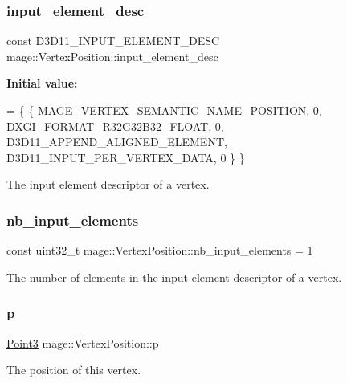 \subsubsection{\texorpdfstring{input\+\_\+element\+\_\+desc}{input\_element\_desc}}
{\footnotesize\ttfamily const D3\+D11\+\_\+\+I\+N\+P\+U\+T\+\_\+\+E\+L\+E\+M\+E\+N\+T\+\_\+\+D\+E\+SC mage\+::\+Vertex\+Position\+::input\+\_\+element\+\_\+desc\hspace{0.3cm}{\ttfamily [static]}}

{\bfseries Initial value\+:}
\begin{DoxyCode}
= \{
        \{ MAGE\_VERTEX\_SEMANTIC\_NAME\_POSITION, 0, DXGI\_FORMAT\_R32G32B32\_FLOAT,    0, 
      D3D11\_APPEND\_ALIGNED\_ELEMENT, D3D11\_INPUT\_PER\_VERTEX\_DATA, 0 \}
    \}
\end{DoxyCode}
The input element descriptor of a vertex. \hypertarget{structmage_1_1_vertex_position_a788286b735c09aa85d855c2773d1a504}{}\label{structmage_1_1_vertex_position_a788286b735c09aa85d855c2773d1a504} 
\subsubsection{\texorpdfstring{nb\+\_\+input\+\_\+elements}{nb\_input\_elements}}
{\footnotesize\ttfamily const uint32\+\_\+t mage\+::\+Vertex\+Position\+::nb\+\_\+input\+\_\+elements = 1\hspace{0.3cm}{\ttfamily [static]}}

The number of elements in the input element descriptor of a vertex. \hypertarget{structmage_1_1_vertex_position_ad9c3ea68e2c1745446387d1eca28f25f}{}\label{structmage_1_1_vertex_position_ad9c3ea68e2c1745446387d1eca28f25f} 
\subsubsection{\texorpdfstring{p}{p}}
{\footnotesize\ttfamily \hyperlink{structmage_1_1_point3}{Point3} mage\+::\+Vertex\+Position\+::p}

The position of this vertex. 